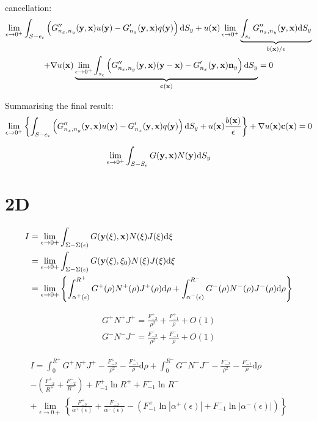 \documentclass[a4paper,11pt]{article}
\newcommand{\td}{\mathrm{d}}
\begin{document}
%
cancellation:
%
\begin{multline}
\lim_{\epsilon \to 0^+}
\int_{S-e_{\epsilon}}
\left(
G''_{n_x,n_y}({\bf y}, {\bf x}) u({\bf y})
- G'_{n_x}({\bf y}, {\bf x}) q({\bf y})
\right)
\td S_y
+
u({\bf x})
\lim_{\epsilon \to 0^+}
\underbrace{
\int_{s_{\epsilon}}
G''_{n_x,n_y}({\bf y}, {\bf x}) 
\td S_y
}_{b({\bf x})/\epsilon}
\\
+
\nabla u({\bf x}) 
\underbrace{
\lim_{\epsilon \to 0^+}
\int_{s_{\epsilon}}
\left(
G''_{n_x,n_y}({\bf y}, {\bf x}) ({\bf y} - {\bf x})
- G'_{n_x}({\bf y}, {\bf x}) {\bf n}_y
\right)
\td S_y
}_{\bf c({\bf x})}
= 0
\end{multline}
%

Summarising the final result:
%
\begin{equation}
\lim_{\epsilon \to 0^+}
\left\{
\int_{S-e_{\epsilon}}
\left(
G''_{n_x,n_y}({\bf y}, {\bf x}) u({\bf y})
- G'_{n_x}({\bf y}, {\bf x}) q({\bf y})
\right)
\td S_y
+
u({\bf x})
\frac{b({\bf x})}{\epsilon}
\right\}
+
\nabla u({\bf x}) 
{\bf c}({\bf x})
= 0
\end{equation}


\begin{equation}
\lim_{\epsilon\to0^+}\int_{S-S_{\epsilon}} G({\bf y}, {\bf x}) N({\bf y}) \td S_y
\end{equation}

\section{2D}

\begin{align}
I &= \lim_{\epsilon \to 0+} \int_{\Sigma-\Sigma(\epsilon)} G({\bf y}(\xi), {\bf x}) N(\xi) J(\xi) \td \xi \nonumber \\
&= \lim_{\epsilon \to 0+} \int_{\Sigma-\Sigma(\epsilon)} G({\bf y}(\xi), \xi_0) N(\xi) J(\xi) \td \xi \nonumber \\
&= \lim_{\epsilon \to 0+} \left\{ \int_{\alpha^+(\epsilon)}^{R^+} G^+(\rho) N^+(\rho) J^+(\rho) \td \rho +
\int_{\alpha^-(\epsilon)}^{R^-} G^-(\rho) N^-(\rho) J^-(\rho) \td \rho
\right\}
\end{align}

\begin{align}
G^+ N^+ J^+ = \frac{F_{-2}^+}{\rho^2} + \frac{F_{-1}^+}{\rho} + O(1) \nonumber \\
G^- N^- J^- = \frac{F_{-2}^-}{\rho^2} + \frac{F_{-1}^-}{\rho} + O(1)
\end{align}

\begin{multline}
I =
\int_{0}^{R^+} G^+ N^+ J^+ - \frac{F_{-2}^+}{\rho^2} - \frac{F_{-1}^+}{\rho} \td \rho +
\int_{0}^{R^-} G^- N^- J^- - \frac{F_{-2}^-}{\rho^2} - \frac{F_{-1}^-}{\rho} \td \rho \\
-
\left(
\frac{F_{-2}^+}{R^+}
+ \frac{F_{-2}^-}{R^-} 
\right)
+ F_{-1}^+ \ln R^+
+ F_{-1}^- \ln R^- \\
+
\lim_{\epsilon \to 0+}
\left\{
\frac{F_{-2}^+}{\alpha^+(\epsilon)}
+ \frac{F_{-2}^-}{\alpha^-(\epsilon)}
- \left(F_{-1}^+ \ln \left|\alpha^+(\epsilon) \right|
+ F_{-1}^- \ln \left|\alpha^-(\epsilon) \right|\right)
\right\}
\end{multline}
\end{document}
